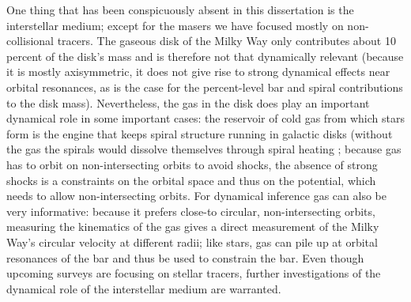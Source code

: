 One thing that has been conspicuously absent in this dissertation is
the interstellar medium; except for the masers we have focused mostly
on non-collisional tracers. The gaseous disk of the Milky Way only
contributes about 10\,percent of the disk's mass and is therefore not
that dynamically relevant (because it is mostly axisymmetric, it does
not give rise to strong dynamical effects near orbital resonances, as
is the case for the percent-level bar and spiral contributions to the
disk mass). Nevertheless, the gas in the disk does play an important
dynamical role in some important cases: the reservoir of cold gas from
which stars form is the engine that keeps spiral structure running in
galactic disks (without the gas the spirals would dissolve themselves
through spiral heating \citep{Carlberg85a}; because gas has to orbit
on non-intersecting orbits to avoid shocks, the absence of strong
shocks is a constraints on the orbital space and thus on the
potential, which needs to allow non-intersecting orbits. For dynamical
inference gas can also be very informative: because it prefers
close-to circular, non-intersecting orbits, measuring the kinematics
of the gas gives a direct measurement of the Milky Way's circular
velocity at different radii; like stars, gas can pile up at orbital
resonances of the bar and thus be used to constrain the bar. Even
though upcoming surveys are focusing on stellar tracers, further
investigations of the dynamical role of the interstellar medium are
warranted.
